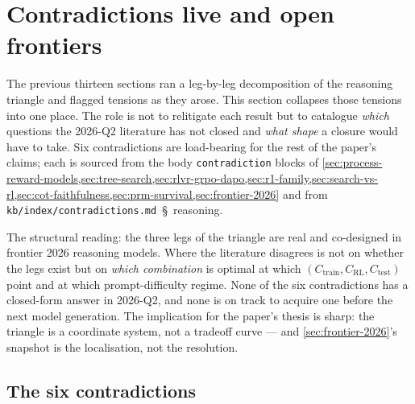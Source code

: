 
\section{Contradictions live and open frontiers}
\label{sec:contradictions}

The previous thirteen sections ran a leg-by-leg decomposition of the
reasoning triangle and flagged tensions as they arose. This section
collapses those tensions into one place. The role is not to relitigate
each result but to catalogue \emph{which} questions the 2026-Q2
literature has not closed and \emph{what shape} a closure would have
to take. Six contradictions are load-bearing for the rest of the
paper's claims; each is sourced from the body
\texttt{contradiction} blocks of \cref{sec:process-reward-models,sec:tree-search,sec:rlvr-grpo-dapo,sec:r1-family,sec:search-vs-rl,sec:cot-faithfulness,sec:prm-survival,sec:frontier-2026}
and from \texttt{kb/index/contradictions.md}~\S~reasoning.

The structural reading: the three legs of the triangle are real and
co-designed in frontier 2026 reasoning models. Where the literature
disagrees is not on whether the legs exist but on \emph{which
combination} is optimal at which $(C_\text{train}, C_\text{RL},
C_\text{test})$ point and at which prompt-difficulty regime. None of
the six contradictions has a closed-form answer in 2026-Q2, and none
is on track to acquire one before the next model generation. The
implication for the paper's thesis is sharp: the triangle is a
coordinate system, not a tradeoff curve --- and \cref{sec:frontier-2026}'s
snapshot is the localisation, not the resolution.

\subsection{The six contradictions}
\label{sec:contradictions-six}

